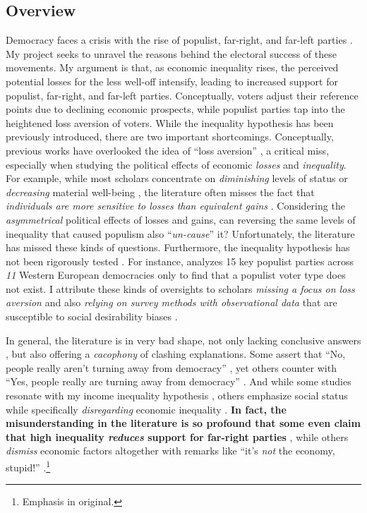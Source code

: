 \documentclass[letterpaper]{article}
\begin{document}
\vspace{-10mm}

\subsection*{Overview}

Democracy faces a crisis with the rise of populist, far-right, and far-left parties \parencite{Mudde2004,Coffe2007a}. My project seeks to unravel the reasons behind the electoral success of these movements. My argument is that, as economic inequality rises, the perceived potential losses for the less well-off intensify, leading to increased support for populist, far-right, and far-left parties. Conceptually, voters adjust their reference points due to declining economic prospects, while populist parties tap into the heightened loss aversion of voters. While the inequality hypothesis has been previously introduced, there are two important shortcomings. Conceptually, previous works have overlooked the idea of ``loss aversion'' \parencite{Kahneman1979}, a critical miss, especially when studying the political effects of economic \emph{losses} and \emph{inequality}. For example, while most scholars concentrate on \emph{diminishing} levels of status \parencite{Gidron2017a} or \emph{decreasing} material well-being \parencite{Oesch2008a}, the literature often misses the fact that \emph{individuals are more sensitive to losses than equivalent gains} \parencite[p. 171]{Levy1992a}. Considering the \emph{asymmetrical} political effects of losses and gains, can reversing the same levels of inequality that caused populism also ``\emph{un-cause}'' it? Unfortunately, the literature has missed these kinds of questions. Furthermore, the inequality hypothesis has not been rigorously tested \parencite[p. 154]{Engler2021}. For instance, \textcite{Rooduijn2018b} analyzes 15 key populist parties across \emph{11} Western European democracies only to find that a populist voter type does not exist. I attribute these kinds of oversights to scholars \emph{missing a focus on loss aversion} and also \emph{relying on survey methods with observational data} that are susceptible to social desirability biases \parencite{Kuklinski1997}. 

\vspace{2mm}In general, the literature is in very bad shape, not only lacking conclusive answers \parencite[p. 6]{Ivarsflaten2008}, but also offering a \emph{cacophony} of clashing explanations. Some assert that ``No, people really aren't turning away from democracy'' \parencite{Voeten2016}, yet others counter with ``Yes, people really are turning away from democracy'' \cite{Mounk2016}. And while some studies resonate with my income inequality hypothesis \parencite{Han2016b}, others emphasize social status while specifically \emph{disregarding} economic inequality \parencite{Gidron2017a,Oesch2008a}. {\bf In fact, the misunderstanding in the literature is so profound that some even claim that high inequality \emph{reduces} support for far-right parties} \parencite[p. 725]{Patana2020b}, while others \emph{dismiss} economic factors altogether with remarks like ``it's \emph{not} the economy, stupid!'' \parencite{Mudde2007b}.\footnote{Emphasis in original.}
\end{document}
